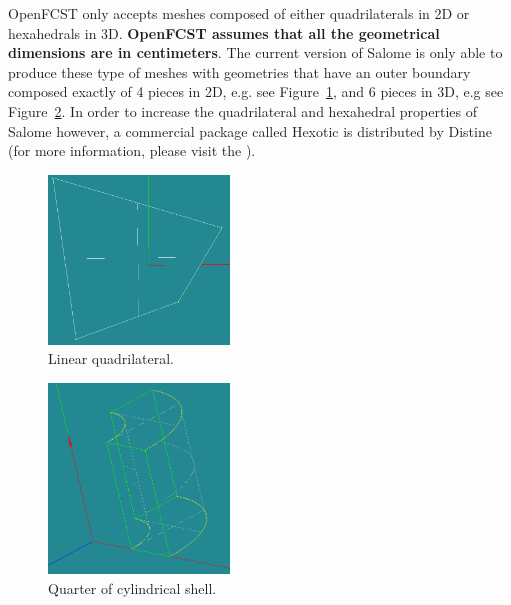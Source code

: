 OpenFCST only accepts meshes composed of either quadrilaterals in 2D or hexahedrals in 3D. \textbf{OpenFCST assumes that all the geometrical dimensions are in centimeters}. The current version of Salome is only able to produce these type of meshes with geometries that have an outer boundary composed exactly of 4 pieces in 2D, e.g. see Figure~\ref{fig:no3.2.1.2}, and 6 pieces in 3D, e.g see Figure~\ref{fig:no3.2.1.3}. In order to increase the quadrilateral and hexahedral properties of Salome however, a commercial package called Hexotic is distributed by Distine (for more information, please visit the ).

\begin{figure}[h!]
\begin{center}
\includegraphics[width=0.43\textwidth]{figures/salome01.png}
\caption{Linear quadrilateral.}
\label{fig:no3.2.1.2}
\end{center}
\end{figure}

\begin{figure}[h!]
\begin{center}
\includegraphics[width=0.43\textwidth]{figures/salome02.png}
\caption{Quarter of cylindrical shell.}
\label{fig:no3.2.1.3}
\end{center}
\end{figure}


